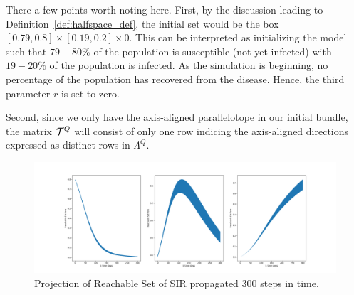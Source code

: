 \begin{example}
  There a few points worth noting here. First, by the discussion leading to Definition~\ref{def:halfspace_def}, the initial set would be the box $[0.79,0.8] \times [0.19, 0.2] \times 0$. This can be interpreted as initializing the model such that $79-80\%$ of the population is susceptible (not yet infected) with $19-20\%$ of the population is infected. As the simulation is beginning, no percentage of the population has recovered from the disease. Hence, the third parameter $r$ is set to zero.

  Second, since we only have the axis-aligned parallelotope in our initial bundle, the matrix $\mathcal{T}^Q$ will consist of only one row indicing the axis-aligned directions expressed as distinct rows in $\Lambda^Q$.

  \begin{figure}
  \label{fig:kaa_sir}
    \hspace*{-2.3cm}
    \includegraphics[width=1.3\textwidth]{figures/SIRProj.png}
    \caption{Projection of Reachable Set of SIR propagated 300 steps in time.}
  \end{figure}
\end{example}

